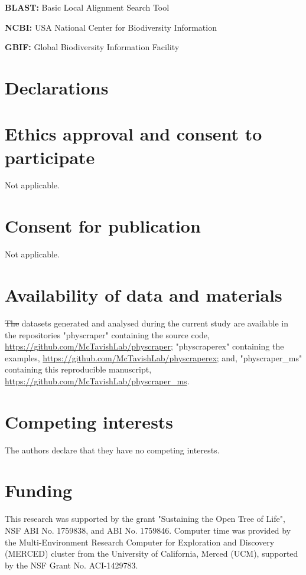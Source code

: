 \documentclass{bmcart}
\providecommand{\DIFaddtex}[1]{{\protect\color{blue}\uwave{#1}}} %
\providecommand{\DIFdeltex}[1]{{\protect\color{red}\sout{#1}}}                      %
\providecommand{\DIFaddbegin}{} %
\providecommand{\DIFaddend}{} %
\providecommand{\DIFdelbegin}{} %
\providecommand{\DIFdelend}{} %
\providecommand{\DIFadd}[1]{\texorpdfstring{\DIFaddtex{#1}}{#1}} %
\providecommand{\DIFdel}[1]{\texorpdfstring{\DIFdeltex{#1}}{}} %
\begin{document}
\textbf{BLAST:} Basic Local Alignment Search Tool

\textbf{NCBI:} USA National Center for Biodiversity Information

\textbf{GBIF:} Global Biodiversity Information Facility

\section*{Declarations}

\begin{backmatter}

\section*{Ethics approval and consent to participate}
Not applicable.

\section*{Consent for publication}
Not applicable.

\section*{Availability of data and materials}

\DIFdelbegin \DIFdel{The }\DIFdelend \DIFaddbegin \DIFadd{Code and }\DIFaddend datasets generated and analysed during the current study are available in
the repositories "physcraper" containing the source code,
\href{https://github.com/McTavishLab/physcraper}{https://github.com/McTavishLab/physcraper};
"physcraperex" containing the examples,
\href{https://github.com/McTavishLab/physcraperex}{https://github.com/McTavishLab/physcraperex};
and, "physcraper\_ms" containing this reproducible manuscript,
\href{https://github.com/McTavishLab/physcraper\_ms}{https://github.com/McTavishLab/physcraper\_ms}.

\section*{Competing interests}
The authors declare that they have no competing interests.

\section*{Funding}
This research was supported by the grant "Sustaining the Open Tree of Life", NSF ABI
No. 1759838, and ABI No. 1759846.
Computer time was provided by the Multi-Environment Research Computer for
Exploration and Discovery (MERCED) cluster from the University of California,
Merced (UCM), supported by the NSF Grant No. ACI-1429783.


\end{backmatter}
\end{document}
